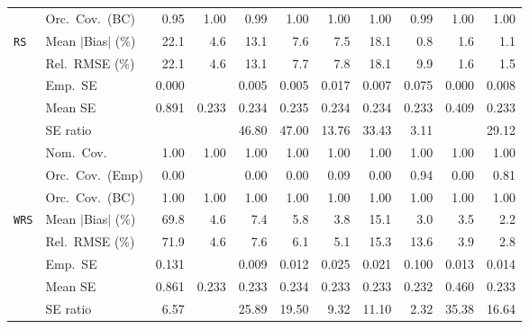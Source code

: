 \begin{landscape}
\begin{longtable}{llrrrrrrrrr}
 & Orc.\ Cov.\ (BC) & \cellcolor{rankone}0.95 & \cellcolor{rankthree}1.00 & \cellcolor{ranktwo}0.99 & \cellcolor{rankthree}1.00 & \cellcolor{rankthree}1.00 & \cellcolor{rankthree}1.00 & \cellcolor{ranktwo}0.99 & \cellcolor{rankthree}1.00 & \cellcolor{rankthree}1.00 \\
\addlinespace[2pt]
\quad \texttt{RS} & Mean $|$Bias$|$ (\%) & 22.1 & 4.6 & 13.1 & 7.6 & 7.5 & 18.1 & \cellcolor{rankone}0.8 & \cellcolor{rankthree}1.6 & \cellcolor{ranktwo}1.1 \\
 & Rel.\ RMSE (\%) & 22.1 & \cellcolor{rankthree}4.6 & 13.1 & 7.7 & 7.8 & 18.1 & 9.9 & \cellcolor{ranktwo}1.6 & \cellcolor{rankone}1.5 \\
 & Emp.\ SE & 0.000 &  & 0.005 & 0.005 & 0.017 & 0.007 & 0.075 & 0.000 & 0.008 \\
 & Mean SE & 0.891 & 0.233 & 0.234 & 0.235 & 0.234 & 0.234 & 0.233 & 0.409 & 0.233 \\
 & SE ratio &  &  & 46.80 & 47.00 & \cellcolor{ranktwo}13.76 & 33.43 & \cellcolor{rankone}3.11 &  & \cellcolor{rankthree}29.12 \\
 & Nom.\ Cov. & \cellcolor{rankone}1.00 & \cellcolor{rankone}1.00 & \cellcolor{rankone}1.00 & \cellcolor{rankone}1.00 & \cellcolor{rankone}1.00 & \cellcolor{rankone}1.00 & \cellcolor{rankone}1.00 & \cellcolor{rankone}1.00 & \cellcolor{rankone}1.00 \\
 & Orc.\ Cov.\ (Emp) & 0.00 &  & 0.00 & 0.00 & \cellcolor{rankthree}0.09 & 0.00 & \cellcolor{rankone}0.94 & 0.00 & \cellcolor{ranktwo}0.81 \\
 & Orc.\ Cov.\ (BC) & \cellcolor{rankone}1.00 & \cellcolor{rankone}1.00 & \cellcolor{rankone}1.00 & \cellcolor{rankone}1.00 & \cellcolor{rankone}1.00 & \cellcolor{rankone}1.00 & \cellcolor{rankone}1.00 & \cellcolor{rankone}1.00 & \cellcolor{rankone}1.00 \\
\addlinespace[2pt]
\quad \texttt{WRS} & Mean $|$Bias$|$ (\%) & 69.8 & 4.6 & 7.4 & 5.8 & 3.8 & 15.1 & \cellcolor{ranktwo}3.0 & \cellcolor{rankthree}3.5 & \cellcolor{rankone}2.2 \\
 & Rel.\ RMSE (\%) & 71.9 & \cellcolor{rankthree}4.6 & 7.6 & 6.1 & 5.1 & 15.3 & 13.6 & \cellcolor{ranktwo}3.9 & \cellcolor{rankone}2.8 \\
 & Emp.\ SE & 0.131 &  & 0.009 & 0.012 & 0.025 & 0.021 & 0.100 & 0.013 & 0.014 \\
 & Mean SE & 0.861 & 0.233 & 0.233 & 0.234 & 0.233 & 0.233 & 0.232 & 0.460 & 0.233 \\
 & SE ratio & \cellcolor{ranktwo}6.57 &  & 25.89 & 19.50 & \cellcolor{rankthree}9.32 & 11.10 & \cellcolor{rankone}2.32 & 35.38 & 16.64 \\

\end{longtable}
\end{landscape}
